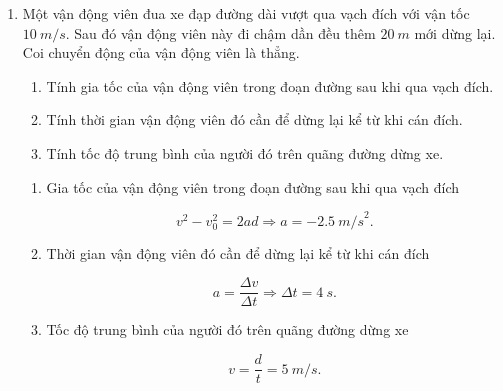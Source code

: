 \begin{enumerate}[label=\bfseries Bài \arabic*:,leftmargin=1.5cm]
{}

	\item {}
	
	
	{Một vận động viên đua xe đạp đường dài vượt qua vạch đích với vận tốc $\SI{10}{m/s}$. Sau đó vận động viên này đi chậm dần đều thêm $\SI{20}{m}$ mới dừng lại. Coi chuyển động của vận động viên là thẳng.
		\begin{enumerate}[label=\alph*)]
			\item Tính gia tốc của vận động viên trong đoạn đường sau khi qua vạch đích.
			\item Tính thời gian vận động viên đó cần để dừng lại kể từ khi cán đích.
			\item Tính tốc độ trung bình của người đó trên quãng đường dừng xe.
		\end{enumerate}
	}
	
	\hideall
	{	
		\begin{enumerate}[label=\alph*)]
			\item Gia tốc của vận động viên trong đoạn đường sau khi qua vạch đích
			
			$$v^2 - v_0^2 = 2ad \Rightarrow a = -\SI{2,5}{m/s}^2.$$
			
			\item Thời gian vận động viên đó cần để dừng lại kể từ khi cán đích
			
			$$a = \dfrac{\Delta v}{\Delta t} \Rightarrow  \Delta t = \SI{4}{s}.$$
			
			\item Tốc độ trung bình của người đó trên quãng đường dừng xe
			
			$$v = \dfrac{d}{t} = \SI{5}{m/s}.$$
		\end{enumerate}
	}
\end{enumerate}
